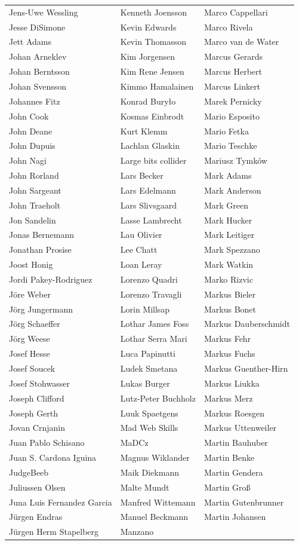 \begin{small}
\begin{tabular}{p{4cm}p{4cm}p{4cm}}
Jens-Uwe Wessling & Kenneth Joensson & Marco Cappellari \\Jesse DiSimone & Kevin Edwards & Marco Rivela \\Jett Adams & Kevin Thomasson & Marco van de Water \\Johan Arneklev & Kim Jorgensen & Marcus Gerards \\Johan Berntsson & Kim Rene Jensen & Marcus Herbert \\Johan Svensson & Kimmo Hamalainen & Marcus Linkert \\Johannes Fitz & Konrad Buryło & Marek Pernicky \\John Cook & Kosmas Einbrodt & Mario Esposito \\John Deane & Kurt Klemm & Mario Fetka \\John Dupuis & Lachlan Glaskin & Mario Teschke \\John Nagi & Large bits collider & Mariusz Tymków \\John Rorland & Lars Becker & Mark Adams \\John Sargeant & Lars Edelmann & Mark Anderson \\John Traeholt & Lars Slivsgaard & Mark Green \\Jon Sandelin & Lasse Lambrecht & Mark Hucker \\Jonas Bernemann & Lau Olivier & Mark Leitiger \\Jonathan Prosise & Lee Chatt & Mark Spezzano \\Joost Honig & Loan Leray & Mark Watkin \\Jordi Pakey-Rodriguez & Lorenzo Quadri & Marko Rizvic \\Jöre Weber & Lorenzo Travagli & Markus Bieler \\Jörg Jungermann & Lorin Millsap & Markus Bonet \\Jörg Schaeffer & Lothar James Foss & Markus Dauberschmidt \\Jörg Weese & Lothar Serra Mari & Markus Fehr \\Josef Hesse & Luca Papinutti & Markus Fuchs \\Josef Soucek & Ludek Smetana & Markus Guenther-Hirn \\Josef Stohwasser & Lukas Burger & Markus Liukka \\Joseph Clifford & Lutz-Peter Buchholz & Markus Merz \\Joseph Gerth & Luuk Spaetgens & Markus Roesgen \\Jovan Crnjanin & Mad Web Skills & Markus Uttenweiler \\Juan Pablo Schisano & MaDCz & Martin Bauhuber \\Juan S. Cardona Iguina & Magnus Wiklander & Martin Benke \\JudgeBeeb & Maik Diekmann & Martin Gendera \\Juliussen Olsen & Malte Mundt & Martin Groß \\Juna Luis Fernandez Garcia & Manfred Wittemann & Martin Gutenbrunner \\Jürgen Endras & Manuel Beckmann & Martin Johansen \\Jürgen Herm Stapelberg & Manzano 
\end{tabular}
\end{small}
